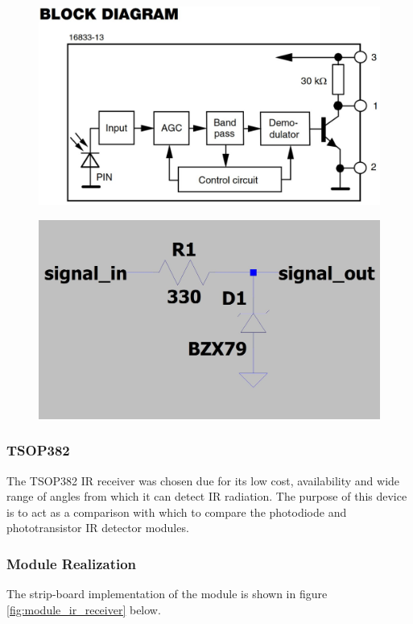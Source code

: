\begin{figure}[H]
	\centering
	\begin{minipage}{.5\textwidth}
		\centering
		\includegraphics[width=.8\linewidth]{figures/design/TSOP382_block_diagram}
		\label{fig:tsop382_block_diagram}
	\end{minipage}%
	\begin{minipage}{.5\textwidth}
		\centering
		\includegraphics[width=.8\linewidth]{figures/design/over_voltage_protection}
		\label{fig:schematic_voltage_clamp}
	\end{minipage}
\end{figure}

\subsubsection{TSOP382}

The TSOP382 IR receiver was chosen due for its low cost, availability and wide range of angles from which it can detect IR radiation. The purpose of this device is to act as a comparison with which to compare the photodiode and phototransistor IR detector modules.


\subsubsection{Module Realization}
The strip-board implementation of the module is shown in figure \ref{fig:module_ir_receiver} below.

